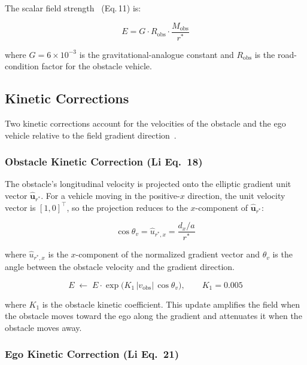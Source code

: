 \documentclass[12pt,a4paper,oneside]{report}
\begin{document}
The scalar field strength~\cite{liSharedControlNovel2019} (Eq.\,11) is:

\begin{equation}
E = G \cdot R_{\mathrm{obs}} \cdot \frac{M_{\mathrm{obs}}}{r^{*}}
\label{eq:lat_field_strength}
\end{equation}

where $G = 6 \times 10^{-3}$ is the gravitational-analogue constant and $R_{\mathrm{obs}}$ is the road-condition factor for the obstacle vehicle.

\subsection{Kinetic Corrections}
\label{sec:lat_kinetic}

Two kinetic corrections account for the velocities of the obstacle and the ego vehicle relative to the field gradient direction~\cite{liSharedControlNovel2019}.

\subsubsection{Obstacle Kinetic Correction (Li Eq.~18)}

The obstacle's longitudinal velocity is projected onto the elliptic gradient unit vector $\hat{\mathbf{u}}_{r^*}$. For a vehicle moving in the positive-$x$ direction, the unit velocity vector is $[1, 0]^{\top}$, so the projection reduces to the $x$-component of $\hat{\mathbf{u}}_{r^*}$:

\begin{equation}
\cos\theta_v = \hat{u}_{r^*,x} = \frac{d_x / a}{r^{*}}
\label{eq:lat_cos_theta_v}
\end{equation}

where $\hat{u}_{r^*,x}$ is the $x$-component of the normalized gradient vector and $\theta_v$ is the angle between the obstacle velocity and the gradient direction.

\begin{equation}
E \;\leftarrow\; E \cdot \exp\!\bigl(K_1\,|v_{\mathrm{obs}}|\,\cos\theta_v\bigr), \qquad K_1 = 0.005
\label{eq:lat_obs_kinetic}
\end{equation}

where $K_1$ is the obstacle kinetic coefficient. This update amplifies the field when the obstacle moves toward the ego along the gradient and attenuates it when the obstacle moves away.

\subsubsection{Ego Kinetic Correction (Li Eq.~21)}
\end{document}
